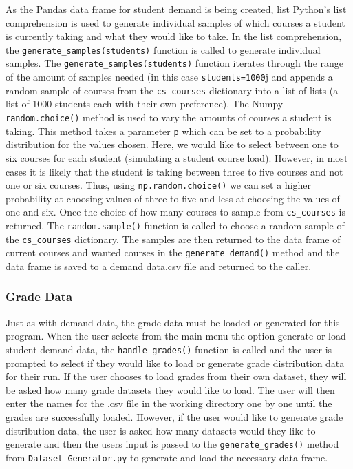 \documentclass[12pt]{article}
\begin{document}
As the Pandas data frame for student demand is being created, list Python's list comprehension is used to 
generate individual samples of which courses a student is currently taking and what they would like to take.
In the list comprehension, the \texttt{generate\_samples(students)} function is called to generate individual 
samples. The \texttt{generate\_samples(students)} function iterates through the range of the amount of samples 
needed (in this case \texttt{students=1000}j and appends a random sample of courses from the \texttt{cs\_courses}
dictionary into a list of lists (a list of 1000 students each with their own preference). The Numpy 
\texttt{random.choice()} method is used to vary the amounts of courses a student is taking. This method 
takes a parameter \texttt{p} which can be set to a probability distribution for the values chosen. Here, we would
like to select between one to six courses for each student (simulating a student course load). However, in most
cases it is likely that the student is taking between three to five courses and not one or six courses. Thus, using 
\texttt{np.random.choice()} we can set a higher probability at choosing values of three to five and less at
choosing the values of one and six. Once the choice of how many courses to sample from \texttt{cs\_courses} 
is returned. The \texttt{random.sample()} function is called to choose a random sample of the \texttt{cs\_courses}
dictionary. The samples are then returned to the data frame of current courses and wanted courses in the 
\texttt{generate\_demand()} method and the data frame is saved to a demand$\_$data.csv file and returned to the caller.

\subsubsection*{Grade Data}
Just as with demand data, the grade data must be loaded or generated for this program. When the user 
selects from the main menu the option generate or load student demand data, the \texttt{handle\_grades()} function
is called and the user is prompted to select if they would like to load or generate grade distribution data for their run. 
If the user chooses to load grades from their own dataset, they will be asked how many grade datasets they
would like to load. The user will then enter the names for the .csv file in the working directory one by one until
the grades are successfully loaded. However, if the user would like to generate grade distribution data, the 
user is asked how many datasets would they like to generate and then the users input is passed to the 
\texttt{generate\_grades()} method from \texttt{Dataset\_Generator.py} to generate and load the necessary
data frame.
\end{document}
